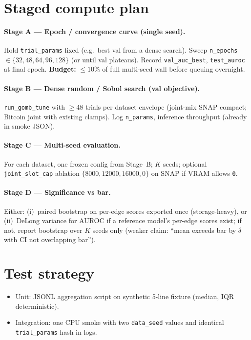 \documentclass{article}
\begin{document}
\section*{Staged compute plan}
\paragraph{Stage A --- Epoch / convergence curve (single seed).}
Hold \texttt{trial\_params} fixed (e.g.\ best val from a dense search).
Sweep \texttt{n\_epochs} $\in \{32,48,64,96,128\}$ (or until val plateaus).
Record \texttt{val\_auc\_best}, \texttt{test\_auroc} at final epoch.
\textbf{Budget:} $\leq 10\%$ of full multi-seed wall before queuing overnight.

\paragraph{Stage B --- Dense random / Sobol search (val objective).}
\texttt{run\_gomb\_tune} with $\geq 48$ trials per dataset envelope
(joint-mix SNAP compact; Bitcoin joint with existing clamps). Log
\texttt{n\_params}, inference throughput (already in smoke JSON).

\paragraph{Stage C --- Multi-seed evaluation.}
For each dataset, one frozen config from Stage~B; $K$ seeds; optional
\texttt{joint\_slot\_cap} ablation $\{8000,12000,16000,0\}$ on SNAP if VRAM
allows \texttt{0}.

\paragraph{Stage D --- Significance vs bar.}
Either: (i)~paired bootstrap on per-edge scores exported once (storage-heavy),
or (ii)~DeLong variance for AUROC if a reference model's per-edge scores exist;
if not, report bootstrap over $K$ seeds only (weaker claim: ``mean exceeds bar
by $\delta$ with CI not overlapping bar'').

\section*{Test strategy}
\begin{itemize}
  \item Unit: JSONL aggregation script on synthetic 5-line fixture (median,
  IQR deterministic).
  \item Integration: one CPU smoke with two \texttt{data\_seed} values and
  identical \texttt{trial\_params} hash in logs.
\end{itemize}
\end{document}
